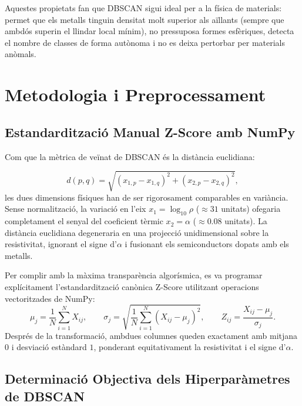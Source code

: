 \documentclass[a4paper,11pt]{article}
\begin{document}
Aquestes propietats fan que DBSCAN sigui ideal per a la física de materials: permet que els metalls tinguin densitat molt superior als aïllants (sempre que ambdós superin el llindar local mínim), no pressuposa formes esfèriques, detecta el nombre de classes de forma autònoma i no es deixa pertorbar per materials anòmals.

\section{Metodologia i Preprocessament}

\subsection{Estandardització Manual Z-Score amb NumPy}

Com que la mètrica de veïnat de DBSCAN és la distància euclidiana:

\begin{equation}
    d(p, q) = \sqrt{(x_{1,p} - x_{1,q})^2 + (x_{2,p} - x_{2,q})^2},
\end{equation}
les dues dimensions físiques han de ser rigorosament comparables en variància.
Sense normalització, la variació en l'eix $x_1 = \log_{10}\rho$ ($\approx 31$ unitats) ofegaria completament el senyal del coeficient tèrmic $x_2 = \alpha$ ($\approx 0.08$ unitats). La distància euclidiana degeneraria en una projecció unidimensional sobre la resistivitat, ignorant el signe d'$\alpha$ i fusionant els semiconductors dopats amb els metalls.

Per complir amb la màxima transparència algorísmica, es va programar explícitament l'estandardització canònica Z-Score utilitzant operacions vectoritzades de NumPy:
\begin{equation}
    \mu_j = \frac{1}{N} \sum_{i=1}^N X_{ij}, \qquad \sigma_j = \sqrt{\frac{1}{N} \sum_{i=1}^N (X_{ij} - \mu_j)^2}, \qquad Z_{ij} = \frac{X_{ij} - \mu_j}{\sigma_j}.
\end{equation}
Després de la transformació, ambdues columnes queden exactament amb mitjana $0$ i desviació estàndard $1$, ponderant equitativament la resistivitat i el signe d'$\alpha$.

\subsection{Determinació Objectiva dels Hiperparàmetres de DBSCAN}
\end{document}
